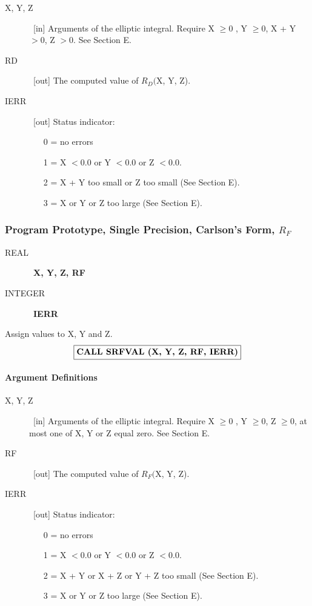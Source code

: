 \documentclass[twoside]{MATH77}
\begin{document}
\begin{description}
\item[X, Y, Z]  \ [in] Arguments of the elliptic integral. Require X $\geq 0$%
, Y $\geq 0$, X + Y $>0$, Z $>0$. See Section E.

\item[RD]  \ [out] The computed value of $R_D($X, Y, Z).

\item[IERR]  \ [out] Status indicator:

\begin{itemize}
\item[0 =]  no errors

\item[1 =]  X $<0.0$ or Y $<0.0$ or Z $<0.0.$

\item[2 =]  X + Y too small or Z too small (See Section E).

\item[3 =]  X or Y or Z too large (See Section E).
\end{itemize}
\end{description}

\subsubsection{Program Prototype, Single Precision, Carlson's Form, $R_F$}

\begin{description}
\item[REAL]  \ {\bf X, Y, Z, RF}

\item[INTEGER]  \ {\bf IERR}
\end{description}

Assign values to X, Y and Z.
$$
\fbox{\bf CALL SRFVAL (X, Y, Z, RF, IERR)}
$$
\paragraph{Argument Definitions}

\begin{description}
\item[X, Y, Z]  \ [in] Arguments of the elliptic integral. Require X $\geq 0$%
, Y $\geq 0$, Z $\geq 0$, at most one of X, Y or Z equal zero. See Section E.

\item[RF]  \ [out] The computed value of $R_F($X, Y, Z).

\item[IERR]  \ [out] Status indicator:

\begin{itemize}
\item[0 =]  no errors

\item[1 =]  X $<0.0$ or Y $<0.0$ or Z $<0.0.$

\item[2 =]  X + Y or X + Z or Y + Z too small (See Section E).

\item[3 =]  X or Y or Z too large (See Section E).
\end{itemize}
\end{description}
\end{document}
